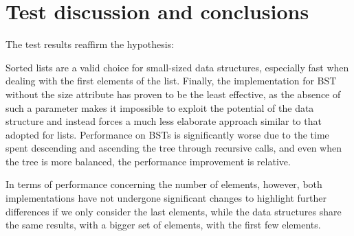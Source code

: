 \documentclass[11pt]{article}
\begin{document}
\section{Test discussion and conclusions}
The test results reaffirm the hypothesis:

Sorted lists are a valid choice for small-sized data structures, especially fast when dealing with the first elements of the list.
Finally, the implementation for BST without the size attribute has proven to be the least effective, as the absence of such a parameter makes it impossible to exploit the potential of the data structure and instead forces a much less elaborate approach similar to that adopted for lists. Performance on BSTs is significantly worse due to the time spent descending and ascending the tree through recursive calls, and even when the tree is more balanced, the performance improvement is relative.

In terms of performance concerning the number of elements, however, both implementations have not undergone significant changes to highlight further differences if we only consider the last elements, while the data structures share the same results, with a bigger set of elements, with the first few elements. 
\end{document}
